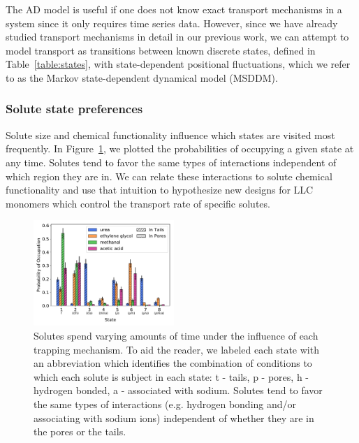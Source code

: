 \documentclass[journal=jctcce,manuscript=article]{achemso}
\begin{document}
  The AD model is useful if one does not know exact transport mechanisms 
  in a system since it only requires time series data. However, since we have
  already studied transport mechanisms in detail in our previous work, we can
  attempt to model transport as transitions between known discrete
  states, defined in Table~\ref{table:states}, with state-dependent positional
  fluctuations, which we refer to as the Markov state-dependent dynamical model (MSDDM).

  \subsubsection{Solute state preferences}\label{section:state_preferences}

  Solute size and chemical functionality influence which states are visited
  most frequently.  In Figure~\ref{fig:state_probabilities}, we plotted the
  probabilities of occupying a given state at any time. Solutes tend to favor
  the same types of interactions independent of which region they are in. We
  can relate these interactions to solute chemical functionality and use that
  intuition to hypothesize new designs for LLC monomers which control the
  transport rate of specific solutes.
  
  \begin{figure}
  \centering
  \includegraphics[width=0.475\textwidth]{state_probabilities.pdf}
  \caption{Solutes spend varying amounts of time under the influence of each
	  trapping mechanism. To aid the reader, we labeled each state with an
	  abbreviation which identifies the combination of conditions to which
	  each solute is subject in each state: t - tails, p - pores, h -
	  hydrogen bonded, a - associated with sodium. Solutes tend to favor
	  the same types of interactions (e.g. hydrogen bonding and/or
	  associating with sodium ions) independent of whether they are in the
	  pores or the tails.}\label{fig:state_probabilities}
  \end{figure}
  
\end{document}
